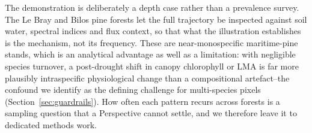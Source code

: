 \documentclass[pdflatex,sn-mathphys-num]{sn-jnl}
\begin{document}
The demonstration is deliberately a depth case rather than a prevalence survey. The Le Bray and Bilos pine forests let the full trajectory be inspected against soil water, spectral indices and flux context, so that what the illustration establishes is the mechanism, not its frequency. These are near-monospecific maritime-pine stands, which is an analytical advantage as well as a limitation: with negligible species turnover, a post-drought shift in canopy chlorophyll or LMA is far more plausibly intraspecific physiological change than a compositional artefact--the confound we identify as the defining challenge for multi-species pixels (Section~\ref{sec:guardrails}). How often each pattern recurs across forests is a sampling question that a Perspective cannot settle, and we therefore leave it to dedicated methods work.
\end{document}

